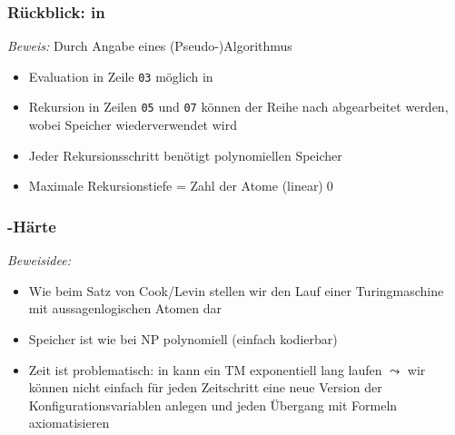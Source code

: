 \documentclass[onlymath]{beamer}
\begin{document}
\begin{frame}\frametitle{Rückblick:  in \PSpace}

\pause

\emph{Beweis:} Durch Angabe eines (Pseudo-)Algorithmus

\smallskip

\begin{itemize}
\item Evaluation in Zeile \texttt{03} möglich in \PSpace
\item Rekursion in Zeilen \texttt{05} und \texttt{07} können der Reihe nach abgearbeitet werden, wobei Speicher wiederverwendet wird
\item Jeder Rekursionsschritt benötigt polynomiellen Speicher
\item Maximale Rekursionstiefe = Zahl der Atome (linear)\qed
\end{itemize}


\end{frame}

\begin{frame}\frametitle{\PSpace-Härte}

\bigskip\pause

\pause

\emph{Beweisidee:}
\begin{itemize}
\item Wie beim Satz von Cook/Levin stellen wir den Lauf einer Turingmaschine
mit aussagenlogischen Atomen dar
\item Speicher ist wie bei NP polynomiell (einfach kodierbar)
\item Zeit ist problematisch: in \PSpace kann ein TM exponentiell lang laufen
$\leadsto$ wir können nicht einfach für jeden Zeitschritt eine neue Version
der Konfigurationsvariablen anlegen und jeden Übergang mit Formeln axiomatisieren
\end{itemize}

\end{frame}
\end{document}
